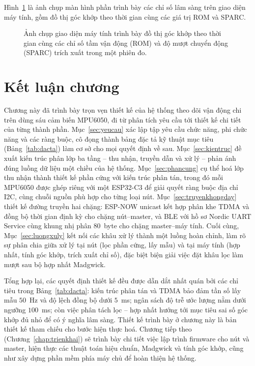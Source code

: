 \documentclass[../DoAn.tex]{subfiles}
\begin{document}
Hình~\ref{fig:clinical_plot} là ảnh chụp màn hình phần trình bày các chỉ số lâm sàng trên giao diện máy tính, gồm đồ thị góc khớp theo thời gian cùng các giá trị ROM và SPARC.

\begin{figure}[h]
    \centering
    \caption{Ảnh chụp giao diện máy tính trình bày đồ thị góc khớp theo thời gian cùng các chỉ số tầm vận động (ROM) và độ mượt chuyển động (SPARC) trích xuất trong một phiên đo.}
    \label{fig:clinical_plot}
\end{figure}


\section{Kết luận chương}
\label{sec:ketchuong3}

Chương này đã trình bày trọn vẹn thiết kế của hệ thống theo dõi vận động chi trên
dùng sáu cảm biến MPU6050, đi từ phân tích yêu cầu tới thiết kế chi tiết của từng
thành phần. Mục~\ref{sec:yeucau} xác lập tập yêu cầu chức năng, phi chức năng và
các ràng buộc, cô đọng thành bảng đặc tả kỹ thuật mục tiêu (Bảng~\ref{tab:dacta})
làm cơ sở cho mọi quyết định về sau. Mục~\ref{sec:kientruc} đề xuất kiến trúc phân
lớp ba tầng -- thu nhận, truyền dẫn và xử lý -- phản ánh đúng luồng dữ liệu một
chiều của hệ thống. Mục~\ref{sec:phancung} cụ thể hoá lớp thu nhận thành thiết kế
phần cứng với kiến trúc phân tán, trong đó mỗi MPU6050 được ghép riêng với một
ESP32-C3 để giải quyết ràng buộc địa chỉ I2C, cùng chuỗi nguồn phù hợp cho từng
loại nút. Mục~\ref{sec:truyenkhongday} thiết kế đường truyền hai chặng: ESP-NOW
unicast kết hợp phân khe TDMA và đồng bộ thời gian định kỳ cho chặng nút--master,
và BLE với hồ sơ Nordic UART Service cùng khung nhị phân $80$~byte cho chặng
master--máy tính. Cuối cùng, Mục~\ref{sec:luongxuly} kết nối các khâu xử lý thành
một luồng hoàn chỉnh, làm rõ sự phân chia giữa xử lý tại nút (lọc phần cứng, lấy
mẫu) và tại máy tính (hợp nhất, tính góc khớp, trích xuất chỉ số), đặc biệt biện
giải việc đặt khâu lọc làm mượt sau bộ hợp nhất Madgwick.

Tổng hợp lại, các quyết định thiết kế đều được dẫn dắt nhất quán bởi các chỉ tiêu
trong Bảng~\ref{tab:dacta}: kiến trúc phân tán và TDMA bảo đảm tần số lấy mẫu
$50$~Hz và độ lệch đồng bộ dưới $5$~ms; ngân sách độ trễ ước lượng nằm dưới ngưỡng
$100$~ms; còn việc phân tách lọc -- hợp nhất hướng tới mục tiêu sai số góc khớp đủ
nhỏ để có ý nghĩa lâm sàng. Thiết kế trình bày ở chương này là bản thiết kế tham
chiếu cho bước hiện thực hoá. Chương tiếp theo (Chương~\ref{chap:trienkhai}) sẽ
trình bày chi tiết việc lập trình firmware cho nút và master, hiện thực các thuật
toán hiệu chuẩn, Madgwick và tính góc khớp, cũng như xây dựng phần mềm phía máy
chủ để hoàn thiện hệ thống.
\end{document}
